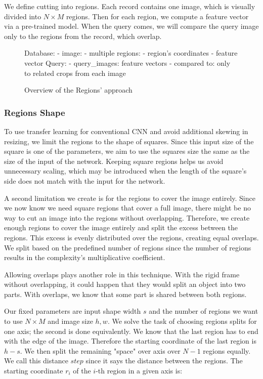 We define cutting into regions. Each record contains one image, which is visually divided into  $N \times M$ regions. Then for each region, we compute a feature vector via a pre-trained model. When the query comes, we will compare the query image only to the regions from the record, which overlap.

\begin{figure}
\centering
\begin{boxedverbatim}
Database:
    - image:
        - multiple regions:
            - region's coordinates
            - feature vector
Query:
    - query_images: feature vectors
    - compared to: only to related crops from each image
\end{boxedverbatim}
\caption{Overview of the Regions' approach}
\end{figure}

\subsubsection{Regions Shape}

To use transfer learning for conventional CNN and avoid additional skewing in resizing, we limit the regions to the shape of squares. Since this input size of the square is one of the parameters, we aim to use the squares size the same as the size of the input of the network. Keeping square regions helps us avoid unnecessary scaling, which may be introduced when the length of the square's side does not match with the input for the network.

A second limitation we create is for the regions to cover the image entirely. Since we now know we need square regions that cover a full image, there might be no way to cut an image into the regions without overlapping. Therefore, we create enough regions to cover the image entirely and split the excess between the regions. This excess is evenly distributed over the regions, creating equal overlaps. We split based on the predefined number of regions since the number of regions results in the complexity's multiplicative coefficient.

Allowing overlaps plays another role in this technique. With the rigid frame without overlapping, it could happen that they would split an object into two parts. With overlaps, we know that some part is shared between both regions.

Our fixed parameters are input shape width $s$ and the number of regions we want to use $N \times M$ and image size $h, w$. We solve the task of choosing regions splits for one axis; the second is done equivalently. We know that the last region has to end with the edge of the image. Therefore the starting coordinate of the last region is $h - s$. We then split the remaining "space" over axis over $N-1$ regions equally. We call this distance $step$ since it says the distance between the regions. The starting coordinate $r_i$ of the $i$-th region in a given axis is:

